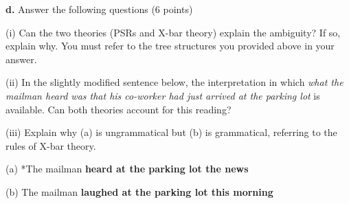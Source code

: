 \documentclass{article}
\begin{document}
\newpage
\noindent \textbf{d.} Answer the following questions (6 points) \par
\bigskip \noindent (i) Can the two theories (PSRs and X-bar theory) explain the ambiguity? If so, explain why. You must refer to the tree structures you provided above in your answer. \par
\vspace{1.5cm}
\noindent (ii) In the slightly modified sentence below, the interpretation in which \textit{what the mailman heard was that his co-worker had just arrived at the parking lot} is available. Can both theories account for this reading? \par
\begin{center}
\medskip {}\par
\end{center}
\vspace{3cm}
\noindent (iii) Explain why (a) is ungrammatical but (b) is grammatical, referring to the rules of X-bar theory.\par
\medskip \noindent (a) *The mailman \textbf{heard at the parking lot the news}\par
\medskip \noindent (b) The mailman \textbf{laughed at the parking lot this morning}

\newpage
\end{document}
